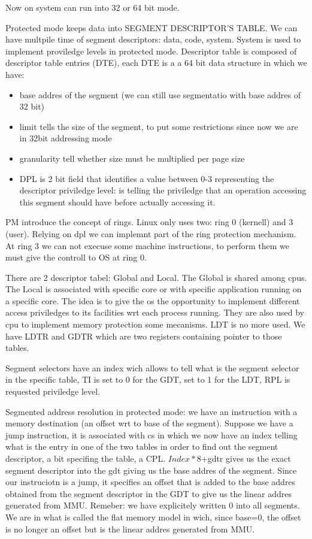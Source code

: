 \documentclass[a4paper,12pt]{article}
\begin{document}
Now on system can run into 32 or 64 bit mode.  

Protected mode keeps data into SEGMENT DESCRIPTOR'S TABLE. We can have multpile time of segment descriptors: data, code, system. System is used to implement proviledge levels in protected mode.
Descriptor table is composed of descriptor table entries (DTE), each DTE is a a 64 bit data structure in which we have: \begin{itemize}
\item base addres of the segment (we can still use segmentatio with base addres of 32 bit)
\item limit tells the size of the segment, to put some restrictions since now we are in 32bit addressing mode
\item granularity tell whether size must be multiplied per page size
\item DPL is 2 bit field that identifies a value between 0-3 representing the descriptor priviledge level: is telling the priviledge that an operation accessing this segment should have before actually accessing it.
\end{itemize}

PM introduce the concept of rings. Linux only uses two: ring 0 (kernell) and 3 (user). Relying on dpl we can implemnt part of the ring protection mechanism. At ring 3 we can not execuse some machine instructions, to perform them we must give the controll to OS at ring 0. 

There are 2 descriptor tabel: Global and Local. The Global is shared among cpus. The Local is associated with specific core or with specific application running on a specific core. The idea is to give the os the opportunity to implement different access priviledges to its facilities wrt each process running. They are also used by cpu to implement memory protection some mecanisms.
LDT is no more used.
We have LDTR and GDTR which are two registers containing pointer to those tables. 

Segment selectors have an index wich allows to tell what is the segment selector in the specific table, TI is set to 0 for the GDT, set to 1 for the LDT, RPL is requested priviledge level.

Segmented address resolution in protected mode: we have an instruction with a memory destination (an offset wrt to base of the segment). Suppose we have a jump instruction, it is associated with cs in which we now have an index telling what is the entry in one of the two tables in order to find out the segment descriptor, a bit specifing the table, a CPL.
$Index*8$+gdtr gives us the exact segment descriptor into the gdt  giving us the base addres of the segment. Since our instruciotn is a jump, it specifies an offset that is added to the base addres obtained from the segment descriptor in the GDT to give us the linear addres generated from MMU. Remeber: we have explicitely written 0 into all segments. We are in what is called the flat memory model in wich, since base=0, the offset is no longer an offset but is the linear addres generated from MMU.
\end{document}
